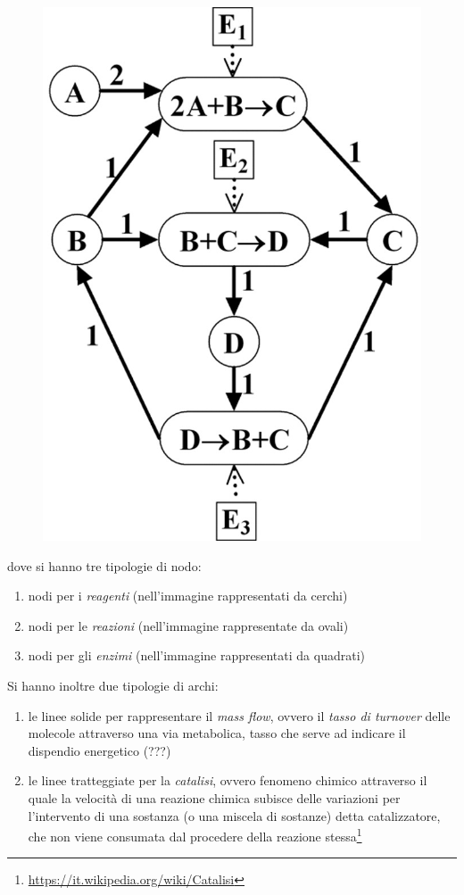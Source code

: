 \documentclass[a4paper,12pt, oneside]{book}
\begin{document}
\begin{figure}[H]
  \centering
  \includegraphics[scale = 0.22]{img/tri.jpg} 
\end{figure}
dove si hanno tre tipologie di nodo:
\begin{enumerate}
  \item nodi per i \textit{reagenti} (nell'immagine rappresentati da cerchi)
  \item nodi per le \textit{reazioni} (nell'immagine rappresentate da ovali)
  \item nodi per gli \textit{enzimi} (nell'immagine rappresentati da quadrati)
\end{enumerate}
Si hanno inoltre due tipologie di archi:
\begin{enumerate}
  \item le linee solide per rappresentare il \textit{mass flow},
  ovvero il \textit{tasso di turnover} delle molecole attraverso una via
  metabolica, tasso che serve ad indicare il dispendio energetico (???)
  \item le linee tratteggiate per la \textit{catalisi}, ovvero fenomeno chimico
  attraverso il quale la velocità di una reazione chimica subisce delle
  variazioni per l'intervento di una sostanza (o una miscela di sostanze) detta
  catalizzatore, che non viene consumata dal procedere della reazione
  stessa\footnote{\url{https://it.wikipedia.org/wiki/Catalisi}} 
\end{enumerate}
\end{document}
